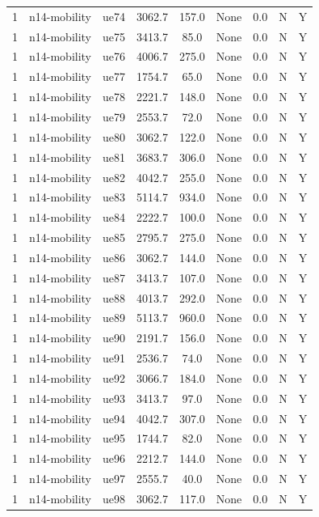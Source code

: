 \begin{table}[ht]
\begin{tabular}{|c|c|c|c|c|c|c|c|c|}
1 & n14-mobility & ue74 & 3062.7 & 157.0 & None & 0.0 & N & Y \\
1 & n14-mobility & ue75 & 3413.7 & 85.0 & None & 0.0 & N & Y \\
1 & n14-mobility & ue76 & 4006.7 & 275.0 & None & 0.0 & N & Y \\
1 & n14-mobility & ue77 & 1754.7 & 65.0 & None & 0.0 & N & Y \\
1 & n14-mobility & ue78 & 2221.7 & 148.0 & None & 0.0 & N & Y \\
1 & n14-mobility & ue79 & 2553.7 & 72.0 & None & 0.0 & N & Y \\
1 & n14-mobility & ue80 & 3062.7 & 122.0 & None & 0.0 & N & Y \\
1 & n14-mobility & ue81 & 3683.7 & 306.0 & None & 0.0 & N & Y \\
1 & n14-mobility & ue82 & 4042.7 & 255.0 & None & 0.0 & N & Y \\
1 & n14-mobility & ue83 & 5114.7 & 934.0 & None & 0.0 & N & Y \\
1 & n14-mobility & ue84 & 2222.7 & 100.0 & None & 0.0 & N & Y \\
1 & n14-mobility & ue85 & 2795.7 & 275.0 & None & 0.0 & N & Y \\
1 & n14-mobility & ue86 & 3062.7 & 144.0 & None & 0.0 & N & Y \\
1 & n14-mobility & ue87 & 3413.7 & 107.0 & None & 0.0 & N & Y \\
1 & n14-mobility & ue88 & 4013.7 & 292.0 & None & 0.0 & N & Y \\
1 & n14-mobility & ue89 & 5113.7 & 960.0 & None & 0.0 & N & Y \\
1 & n14-mobility & ue90 & 2191.7 & 156.0 & None & 0.0 & N & Y \\
1 & n14-mobility & ue91 & 2536.7 & 74.0 & None & 0.0 & N & Y \\
1 & n14-mobility & ue92 & 3066.7 & 184.0 & None & 0.0 & N & Y \\
1 & n14-mobility & ue93 & 3413.7 & 97.0 & None & 0.0 & N & Y \\
1 & n14-mobility & ue94 & 4042.7 & 307.0 & None & 0.0 & N & Y \\
1 & n14-mobility & ue95 & 1744.7 & 82.0 & None & 0.0 & N & Y \\
1 & n14-mobility & ue96 & 2212.7 & 144.0 & None & 0.0 & N & Y \\
1 & n14-mobility & ue97 & 2555.7 & 40.0 & None & 0.0 & N & Y \\
1 & n14-mobility & ue98 & 3062.7 & 117.0 & None & 0.0 & N & Y \\

\end{tabular}
\end{table}
